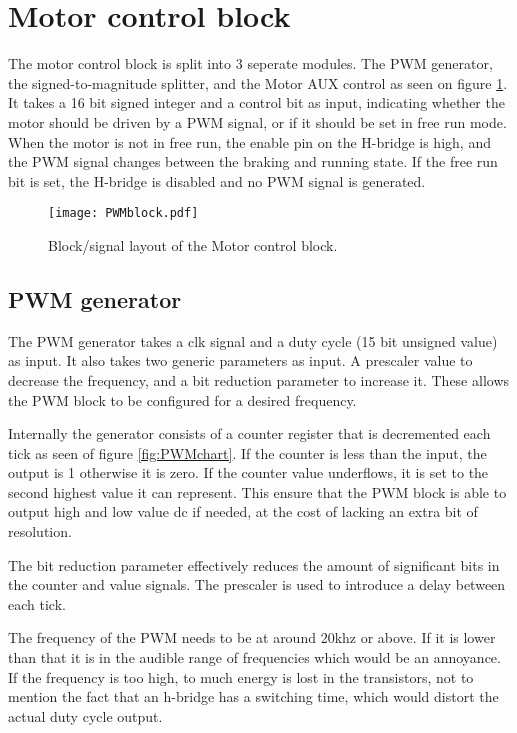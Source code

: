 \section{Motor control block}


The motor control block is split into 3 seperate modules.
The PWM generator, the signed-to-magnitude splitter, and the Motor AUX control as seen on figure \ref{fig:PWMblock}.
It takes a 16 bit signed integer and a control bit as input, indicating whether the motor should be driven by a PWM signal, or if it should be set in free run mode. 
When the motor is not in free run, the enable pin on the H-bridge is high, and the PWM signal changes between the braking and running state. If the free run bit is set, the H-bridge is disabled and no PWM signal is generated.

\begin{figure}[htb]
\centering
\texttt{[image: PWMblock.pdf]}
\caption{Block/signal layout of the Motor control block.}
\label{fig:PWMblock}
\end{figure}

\subsection{PWM generator}
The PWM generator takes a clk signal and a duty cycle (15 bit unsigned value) as input. It also takes two generic parameters as input. A prescaler value to decrease the frequency, and a bit reduction parameter to increase it. These allows the PWM block to be configured for a desired frequency.

Internally the generator consists of a counter register that is decremented each tick as seen of figure \ref{fig:PWMchart}. If the counter is less than the input, the output is 1 otherwise it is zero.
If the counter value underflows, it is set to the second highest value it can represent. This ensure that the PWM block is able to output high and low value dc if needed, at the cost of lacking an extra bit of resolution.

The bit reduction parameter effectively reduces the amount of significant bits in the counter and value signals.
The prescaler is used to introduce a delay between each tick.

The frequency of the PWM needs to be at around 20khz or above. If it is lower than that it is in the audible range of frequencies which would be an annoyance. If the frequency is too high, to much energy is lost in the transistors, not to mention the fact that an h-bridge has a switching time, which would distort the actual duty cycle output.

